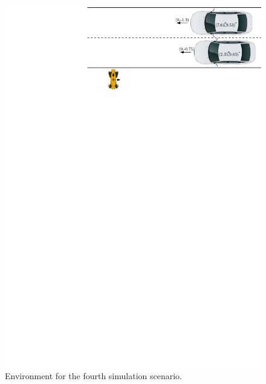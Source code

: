         \\
            \begin{figure}[ht]
                \centering
                \includegraphics[width=\linewidth]{images/simulations/scene4.pdf}
                \caption{Environment for the fourth simulation scenario.}
                \label{fig:scene4}
            \end{figure}
